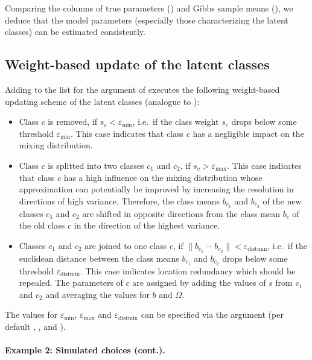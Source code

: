 \documentclass[article,shortnames]{jss}
\newcommand{\fct}[1]{\code{#1()}}
\begin{document}
Comparing the columns of true parameters () and Gibbs sample means (), we deduce that the model parameters (especially those characterizing the latent classes) can be estimated consistently.

\subsection{Weight-based update of the latent classes} \label{subsec:weight_update}

Adding  to the list for the  argument of \fct{fit\_model} executes the following weight-based updating scheme of the latent classes (analogue to \cite{Bauer:2019}):

\begin{itemize}
  \item Class $c$ is removed, if $s_c<\varepsilon_{\text{min}}$, i.e.\ if the class weight $s_c$ drops below some threshold $\varepsilon_{\text{min}}$. This case indicates that class $c$ has a negligible impact on the mixing distribution.
  \item Class $c$ is splitted into two classes $c_1$ and $c_2$, if $s_c>\varepsilon_\text{max}$. This case indicates that class $c$ has a high influence on the mixing distribution whose approximation can potentially be improved by increasing the resolution in directions of high variance. Therefore, the class means $b_{c_1}$ and $b_{c_2}$ of the new classes $c_1$ and $c_2$ are shifted in opposite directions from the class mean $b_c$ of the old class $c$ in the direction of the highest variance.
  \item Classes $c_1$ and $c_2$ are joined to one class $c$, if $\lVert b_{c_1} - b_{c_2} \rVert<\varepsilon_{\text{distmin}}$, i.e.\ if the euclidean distance between the class means $b_{c_1}$ and $b_{c_2}$  drops below some threshold $\varepsilon_{\text{distmin}}$. This case indicates location redundancy which should be repealed. The parameters of $c$ are assigned by adding the values of $s$ from $c_1$ and $c_2$ and averaging the values for $b$ and $\Omega$.
\end{itemize}

The values for $\varepsilon_{\text{min}}$, $\varepsilon_{\text{max}}$ and $\varepsilon_{\text{distmin}}$ can be specified via the  argument (per default , , and ).

\paragraph{Example 2: Simulated choices (cont.).}
\end{document}
